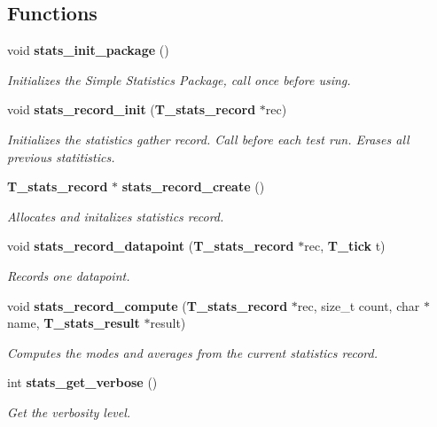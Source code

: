 \subsection*{Functions}
\begin{CompactItemize}
\item 
void {\bf stats\_\-init\_\-package} ()
\begin{CompactList}\small\item\em Initializes the Simple Statistics Package, call once before using.\item\end{CompactList}\item 
void {\bf stats\_\-record\_\-init} ({\bf T\_\-stats\_\-record} $\ast$rec)
\begin{CompactList}\small\item\em Initializes the statistics gather record. Call before each test run. Erases all previous statitistics.\item\end{CompactList}\item 
{\bf T\_\-stats\_\-record} $\ast$ {\bf stats\_\-record\_\-create} ()
\begin{CompactList}\small\item\em Allocates and initalizes statistics record.\item\end{CompactList}\item 
void {\bf stats\_\-record\_\-datapoint} ({\bf T\_\-stats\_\-record} $\ast$rec, {\bf T\_\-tick} t)
\begin{CompactList}\small\item\em Records one datapoint.\item\end{CompactList}\item 
void {\bf stats\_\-record\_\-compute} ({\bf T\_\-stats\_\-record} $\ast$rec, size\_\-t count, char $\ast$name, {\bf T\_\-stats\_\-result} $\ast$result)
\begin{CompactList}\small\item\em Computes the modes and averages from the current statistics record.\item\end{CompactList}\item 
int {\bf stats\_\-get\_\-verbose} ()
\begin{CompactList}\small\item\em Get the verbosity level.\item\end{CompactList}\item 

\end{CompactItemize}
